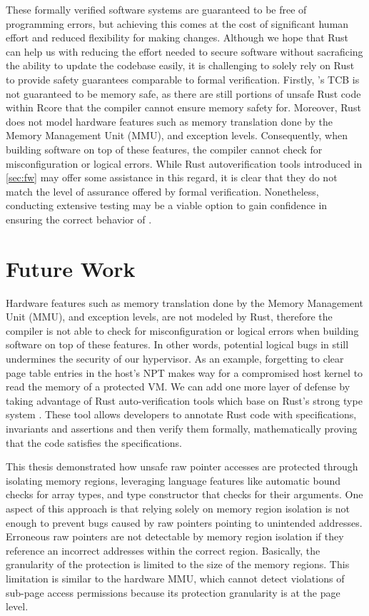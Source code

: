 These formally verified software systems are guaranteed to be free of
programming errors, but achieving this comes at the cost of significant human
effort and reduced flexibility for making changes.
Although we hope that Rust can help us with reducing the effort needed to secure
software without sacraficing the ability to update the codebase easily,
it is challenging to solely rely on Rust to provide safety guarantees
comparable to formal verification.
Firstly, \rustsec{}'s TCB \rustcore{} is not guaranteed to be memory safe, as
there are still portions of unsafe Rust code within Rcore that the compiler
cannot ensure memory safety for.
Moreover, Rust does not model hardware features
such as memory translation done by the Memory Management Unit (MMU), and
exception levels. Consequently, when building software on top of these features,
the compiler cannot check for misconfiguration or logical errors.
While Rust
autoverification tools introduced in \autoref{sec:fw} may offer some assistance
in this regard, it is clear that they do not match the level of assurance
offered by formal verification.
Nonetheless, conducting extensive testing may be a viable option to gain
confidence in ensuring the correct behavior of \rustcore{}.

\section{Future Work}
\label{sec:fw}

Hardware features such as memory translation done by the Memory Management
Unit (MMU), and exception levels, are not modeled by Rust, therefore the
compiler is not able to check for misconfiguration or logical errors when
building software on top of these features.
In other words, potential logical bugs in \rustcore{} still undermines the
security of our hypervisor.
As an example, forgetting to clear page table entries in the host's NPT
makes way for a compromised host kernel to read the memory of a protected VM.
We can add one more layer of defense by taking advantage of Rust
auto-verification tools which base on Rust's strong type system
\cite{Verus, Prusti, Creusot, Flux}. These tool allows developers to annotate
Rust code with specifications, invariants and assertions and then verify them
formally, mathematically proving that the code satisfies the specifications.

This thesis demonstrated how unsafe raw pointer accesses are protected through
isolating memory regions,
leveraging language features like automatic bound checks for array types, and
type constructor that checks for their arguments.
One aspect of this approach is that
relying solely on memory region isolation is not enough to prevent bugs caused
by raw pointers pointing to unintended addresses.
Erroneous raw pointers are not detectable by memory region isolation if they
reference an incorrect addresses within the correct region.
Basically, the granularity of the protection is limited to the size of the
memory regions. This limitation is similar to the hardware MMU, which cannot
detect violations of sub-page access permissions because its protection
granularity is at the page level.

